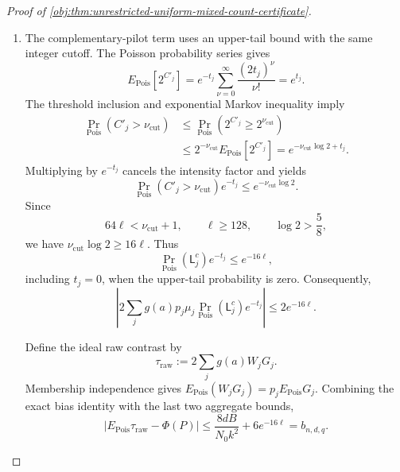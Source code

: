 \documentclass[11pt]{article}
\begin{document}
\begin{proof}[Proof of \cref{obj:thm:unrestricted-uniform-mixed-count-certificate}]
\begin{enumerate}
For \(t_j>B\), Cauchy--Schwarz and the heavy moment estimate give
\[
\begin{aligned}
\left\{
\Pr_{\mathrm{Pois}}(\mathsf L_j)
|E_{\mathrm{Pois}}H_j|
\right\}^2
&\le
\Pr_{\mathrm{Pois}}(\mathsf L_j)
E_{\mathrm{Pois}}H_j^2\\
&\le e^{-t_j/8}.
\end{aligned}
\]
Using
\(\mu_jQ_k(t_j)=\mu_j-E_{\mathrm{Pois}}H_j\), it follows that
\[
\begin{aligned}
\mu_j\Pr_{\mathrm{Pois}}(\mathsf L_j)|Q_k(t_j)|
&\le
\Pr_{\mathrm{Pois}}(\mathsf L_j)
+\Pr_{\mathrm{Pois}}(\mathsf L_j)|E_{\mathrm{Pois}}H_j|\\
&\le2e^{-t_j/16}\le2e^{-16\ell}.
\end{aligned}
\]
Splitting the cell sum at \(t_j=B\), using \(|g(a)|=1\) from
\cref{obj:synth_19}, and then using \(4d\) cells and \(\sum_jp_j=1\), yields
\[
\left|
2\sum_jg(a)p_j\mu_j
\Pr_{\mathrm{Pois}}(\mathsf L_j)Q_k(t_j)
\right|
\le\frac{8dB}{N_0k^2}+4e^{-16\ell}.
\]

\item The complementary-pilot term uses an upper-tail bound with the same
integer cutoff. The Poisson probability series gives
\[
E_{\mathrm{Pois}}[2^{C'_j}]
=e^{-t_j}\sum_{\nu=0}^{\infty}\frac{(2t_j)^\nu}{\nu!}
=e^{t_j}.
\]
The threshold inclusion and exponential Markov inequality imply
\[
\begin{aligned}
\Pr_{\mathrm{Pois}}(C'_j>\nu_{\mathrm{cut}})
&\le\Pr_{\mathrm{Pois}}(2^{C'_j}\ge2^{\nu_{\mathrm{cut}}})\\
&\le2^{-\nu_{\mathrm{cut}}}E_{\mathrm{Pois}}[2^{C'_j}]
=e^{-\nu_{\mathrm{cut}}\log2+t_j}.
\end{aligned}
\]
Multiplying by \(e^{-t_j}\) cancels the intensity factor and yields
\[
\Pr_{\mathrm{Pois}}(C'_j>\nu_{\mathrm{cut}})e^{-t_j}
\le e^{-\nu_{\mathrm{cut}}\log2}.
\]
Since
\[
64\ell<\nu_{\mathrm{cut}}+1,\qquad
\ell\ge128,\qquad \log2>\frac58,
\]
we have \(\nu_{\mathrm{cut}}\log2\ge16\ell\). Thus
\[
\Pr_{\mathrm{Pois}}(\mathsf L_j^c)e^{-t_j}\le e^{-16\ell},
\]
including \(t_j=0\), when the upper-tail probability is zero.
Consequently,
\[
\left|
2\sum_jg(a)p_j\mu_j
\Pr_{\mathrm{Pois}}(\mathsf L_j^c)e^{-t_j}
\right|
\le2e^{-16\ell}.
\]

Define the ideal raw contrast by
\[
\tau_{\mathrm{raw}}
:=2\sum_jg(a)W_jG_j.
\]
Membership independence gives
\(E_{\mathrm{Pois}}(W_jG_j)=p_jE_{\mathrm{Pois}}G_j\).
Combining the exact bias identity with the last two aggregate bounds,
\[
|E_{\mathrm{Pois}}\tau_{\mathrm{raw}}-\Phi(P)|
\le
\frac{8dB}{N_0k^2}+6e^{-16\ell}
=b_{n,d,q}.
\]


\end{enumerate}
\end{proof}
\end{document}
